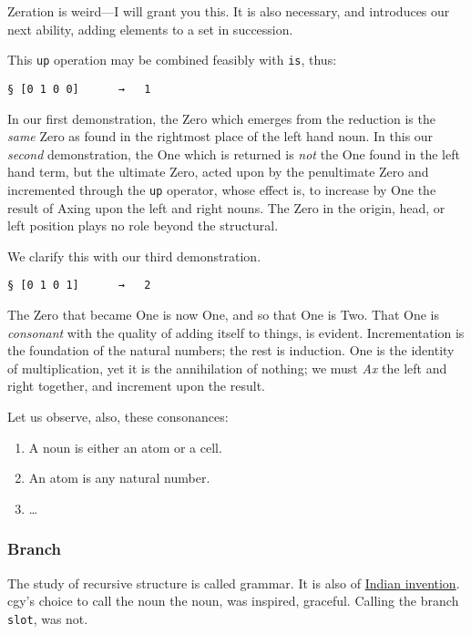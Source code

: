 \documentclass[twoside]{article}
\begin{document}
Zeration is weird---I will grant you this. It is also necessary, and introduces our next ability, adding elements to a set in succession.

This \texttt{up} operation may be combined feasibly with \texttt{is}, thus:

\begin{lstlisting}[style=listingcode]
§ [0 1 0 0]      →   1
\end{lstlisting}

\noindent
In our first demonstration, the Zero which emerges from the reduction is the \emph{same} Zero as found in the rightmost place of the left hand noun. In this our \emph{second} demonstration, the One which is returned is \emph{not} the One found in the left hand term, but the ultimate Zero, acted upon by the penultimate Zero and incremented through the \texttt{up} operator, whose effect is, to increase by One the result of Axing upon the left and right nouns. The Zero in the origin, head, or left position plays no role beyond the structural.

We clarify this with our third demonstration.

\begin{lstlisting}[style=listingcode]
§ [0 1 0 1]      →   2
\end{lstlisting}

\noindent
The Zero that became One is now One, and so that One is Two.  That One is \emph{consonant} with the quality of adding itself to things, is evident. Incrementation is the foundation of the natural numbers; the rest is induction. One is the identity of multiplication, yet it is the annihilation of nothing; we must \emph{Ax} the left and right together, and increment upon the result.

Let us observe, also, these consonances:

\begin{enumerate}
  \setcounter{enumi}{0}
  \item A noun is either an atom or a cell.
  \item An atom is any natural number.
  \item \ldots{}
\end{enumerate}

\subsubsection{Branch}

The study of recursive structure is called grammar. It is also of \href{https://en.wikipedia.org/wiki/P%C4%81%E1%B9%87ini}{Indian invention}. cgy's choice to call the noun the noun, was inspired, graceful. Calling the branch \texttt{slot}, was not.
\end{document}
